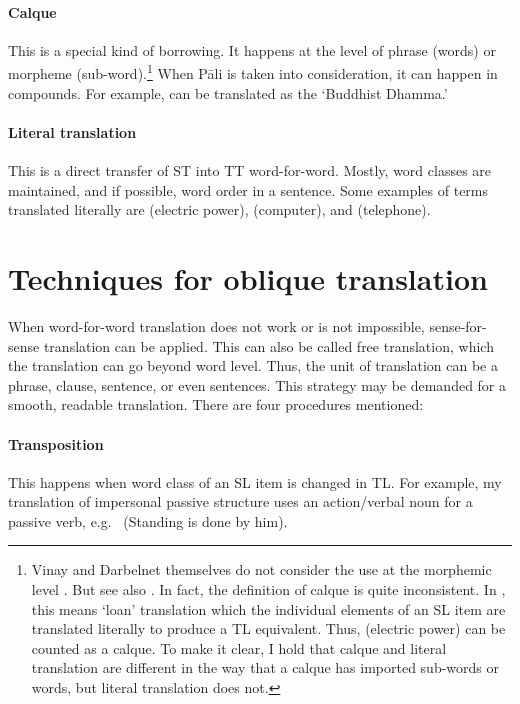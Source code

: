 \paragraph*{Calque} This is a special kind of borrowing. It happens at the level of phrase (words) or morpheme (sub-word).\footnote{Vinay and Darbelnet themselves do not consider the use at the morphemic level \citep[p.~35]{fawcett:translation}. But see also \citealp[p.~182]{munday:companion}. In fact, the definition of calque is quite inconsistent. In \citealp[pp.~17--8]{shuttleworth:dictionary}, this means `loan' translation which the individual elements of an SL item are translated literally to produce a TL equivalent. Thus,  (electric power) can be counted as a calque. To make it clear, I hold that calque and literal translation are different in the way that a calque has imported sub-words or words, but literal translation does not.} When P\=ali is taken into consideration, it can happen in compounds. For example,  can be translated as the `Buddhist Dhamma.'

\paragraph*{Literal translation} This is a direct transfer of ST into TT word-for-word. Mostly, word classes are maintained, and if possible, word order in a sentence. Some examples of terms translated literally are  (electric power),  (computer), and  (telephone).

\section*{Techniques for oblique translation}

When word-for-word translation does not work or is not impossible, sense-for-sense translation can be applied. This can also be called free translation, which the translation can go beyond word level. Thus, the unit of translation can be a phrase, clause, sentence, or even sentences. This strategy may be demanded for a smooth, readable translation. There are four procedures mentioned:

\paragraph*{Transposition} This happens when word class of an SL item is changed in TL. For example, my translation of impersonal passive structure uses an action/verbal noun for a passive verb, e.g.\  (Standing is done by him).

